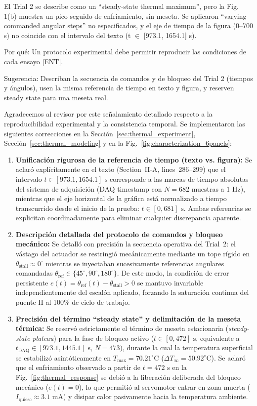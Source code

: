 \documentclass{LabDSTresponse}
\begin{document}
{El Trial 2 se describe como un “steady-state thermal maximum”, pero la Fig. 1(b) muestra un pico seguido de enfriamiento, sin meseta. Se aplicaron “varying commanded angular steps” no especificados, y el eje de tiempo de la figura (0–700 s) no coincide con el intervalo del texto (t $\in$ [973.1, 1654.1] s).

Por qué: Un protocolo experimental debe permitir reproducir las condiciones de cada ensayo [ENT].

Sugerencia: Describan la secuencia de comandos y de bloqueo del Trial 2 (tiempos y ángulos), usen la misma referencia de tiempo en texto y figura, y reserven steady state para una meseta real.}
{Agradecemos al revisor por este señalamiento detallado respecto a la reproducibilidad experimental y la consistencia temporal. Se implementaron las siguientes correcciones en la Sección~\ref{sec:thermal_experiment}, Sección~\ref{sec:thermal_modeling} y en la Fig.~\ref{fig:characterization_6panels}:
\begin{enumerate}
    \item \textbf{Unificación rigurosa de la referencia de tiempo (texto vs. figura):} Se aclaró explícitamente en el texto (Section~II-A, lines~286--299) que el intervalo $t \in [973.1, 1654.1]\text{ s}$ corresponde a las marcas de tiempo absolutas del sistema de adquisición (DAQ timestamp con $N = 682$ muestras a $1\text{ Hz}$), mientras que el eje horizontal de la gráfica está normalizado a tiempo transcurrido desde el inicio de la prueba: $t \in [0, 681]\text{ s}$. Ambas referencias se explicitan coordinadamente para eliminar cualquier discrepancia aparente.
    \item \textbf{Descripción detallada del protocolo de comandos y bloqueo mecánico:} Se detalló con precisión la secuencia operativa del Trial~2: el vástago del actuador se restringió mecánicamente mediante un tope rígido en $\theta_{\text{stall}} \approx 0^\circ$ mientras se inyectaban sucesivamente referencias angulares comandadas $\theta_{\text{ref}} \in \{45^\circ, 90^\circ, 180^\circ\}$. De este modo, la condición de error persistente $e(t) = \theta_{\text{ref}}(t) - \theta_{\text{stall}} > 0$ se mantuvo invariable independientemente del escalón aplicado, forzando la saturación continua del puente H al 100\% de ciclo de trabajo.
    \item \textbf{Precisión del término ``steady state'' y delimitación de la meseta térmica:} Se reservó estrictamente el término de meseta estacionaria (\textit{steady-state plateau}) para la fase de bloqueo activo ($t \in [0, 472]\text{ s}$, equivalente a $t_{\text{DAQ}} \in [973.1, 1445.1]\text{ s}$, $N = 473$), durante la cual la temperatura superficial se estabilizó asintóticamente en $T_{\max} = 70.21^\circ\text{C}$ ($\Delta T_\infty = 50.92^\circ\text{C}$). Se aclaró que el enfriamiento observado a partir de $t = 472\text{ s}$ en la Fig.~\ref{fig:thermal_response} se debió a la liberación deliberada del bloqueo mecánico ($e(t) = 0$), lo que permitió al servomotor entrar en zona muerta ($I_{\text{quiesc}} \approx 3.1\text{ mA}$) y disipar calor pasivamente hacia la temperatura ambiente.

\end{enumerate}}
\end{document}
